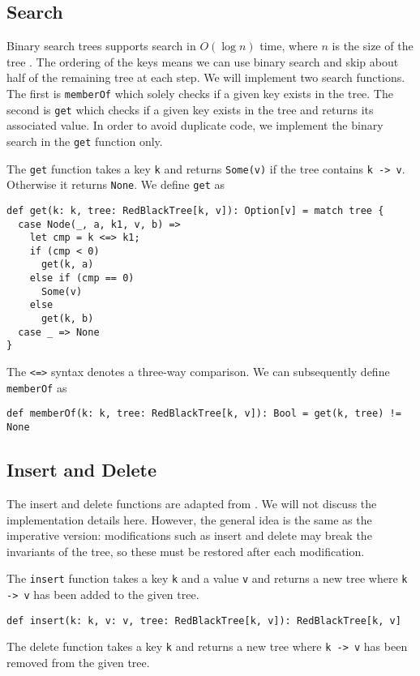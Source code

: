 \documentclass[../main.tex]{subfiles}
\begin{document}
\subsection{Search}

Binary search trees supports search in $O(\log{n})$ time, where $n$ is the size of the tree \citep{cormen-et-al-2009}. The ordering of the keys means we can use binary search and skip about half of the remaining tree at each step. We will implement two search functions. The first is \lstinline{memberOf} which solely checks if a given key exists in the tree. The second is \lstinline{get} which checks if a given key exists in the tree and returns its associated value. In order to avoid duplicate code, we implement the binary search in the \lstinline{get} function only.

The \lstinline{get} function takes a key \lstinline{k} and returns \lstinline{Some(v)} if the tree contains \lstinline{k -> v}. Otherwise it returns \lstinline{None}. We define \lstinline{get} as
\begin{lstlisting}[language=Flix]
def get(k: k, tree: RedBlackTree[k, v]): Option[v] = match tree {
  case Node(_, a, k1, v, b) =>
    let cmp = k <=> k1;
    if (cmp < 0)
      get(k, a)
    else if (cmp == 0)
      Some(v)
    else
      get(k, b)
  case _ => None
}
\end{lstlisting}
The \lstinline{<=>} syntax denotes a three-way comparison. We can subsequently define \lstinline{memberOf} as
\begin{lstlisting}[language=Flix]
def memberOf(k: k, tree: RedBlackTree[k, v]): Bool = get(k, tree) != None
\end{lstlisting}

\subsection{Insert and Delete}

The insert and delete functions are adapted from \citet{okasaki-1998, germane-matthew-2014}. We will not discuss the implementation details here. However, the general idea is the same as the imperative version: modifications such as insert and delete may break the invariants of the tree, so these must be restored after each modification.

The \lstinline{insert} function takes a key \lstinline{k} and a value \lstinline{v} and returns a new tree where \lstinline{k -> v} has been added to the given tree.
\begin{lstlisting}[language=Flix]
def insert(k: k, v: v, tree: RedBlackTree[k, v]): RedBlackTree[k, v]
\end{lstlisting}
The delete function takes a key \lstinline{k} and returns a new tree where \lstinline{k -> v} has been removed from the given tree.
\end{document}
